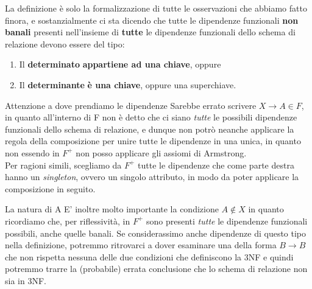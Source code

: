 \documentclass[12pt]{report}
\newcommand{\ra}{
	\rightarrow
}
\begin{document}
	La definizione è solo la formalizzazione di tutte le osservazioni che abbiamo fatto finora, e sostanzialmente ci sta dicendo che tutte le dipendenze funzionali \textbf{non banali} presenti nell'insieme di \textbf{tutte} le dipendenze funzionali dello schema di relazione devono essere del tipo:
	\begin{enumerate}
		\item Il \textbf{determinato} \textbf{appartiene ad una chiave}, oppure
		\item Il \textbf{determinante} \textbf{è una chiave}, oppure una superchiave.
	\end{enumerate}
	
	\begin{osservazione}{Attenzione a dove prendiamo le dipendenze}{}
		Sarebbe errato scrivere $X \ra A \in F$, in quanto all'interno di F non è detto che ci siano \textit{tutte} le possibili dipendenze funzionali dello schema di relazione, e dunque non potrò neanche applicare la regola della composizione per unire tutte le dipendenze in una unica, in quanto non essendo in $F^+$ non posso applicare gli assiomi di Armstrong.\\
		Per ragioni simili, scegliamo da $F^+$ tutte le dipendenze che come parte destra hanno un \textit{singleton}, ovvero un singolo attributo, in modo da poter applicare la composizione in seguito.
	\end{osservazione}	
	
	\begin{osservazione}{La natura di A}{}
		E' inoltre molto importante la condizione $A \notin X$ in quanto ricordiamo che, per riflessività, in $F^+$ sono presenti \textit{tutte} le dipendenze funzionali possibili, anche quelle banali. Se considerassimo anche dipendenze di questo tipo nella definizione, potremmo ritrovarci a dover esaminare una della forma $B \ra B$ che non rispetta nessuna delle due condizioni che definiscono la 3NF e quindi potremmo trarre la (probabile) errata conclusione che lo schema di relazione non sia in 3NF.
	\end{osservazione}
	
\end{document}
